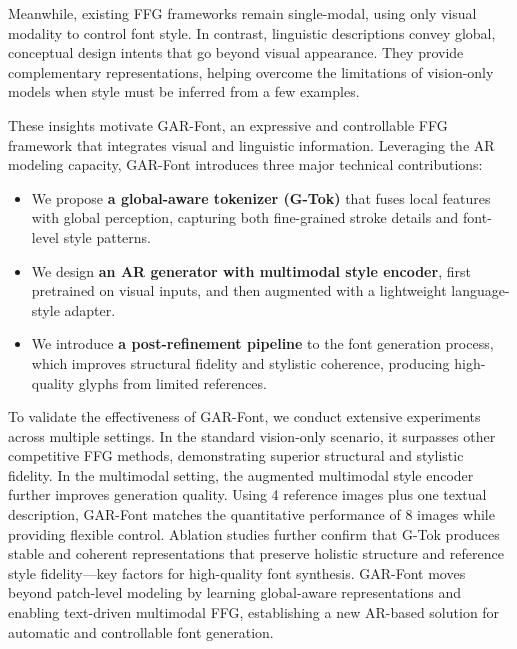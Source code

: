 Meanwhile, existing FFG frameworks remain single-modal, using only visual modality to control font style. In contrast, linguistic descriptions convey global, conceptual design intents that go beyond visual appearance. They provide complementary representations, helping overcome the limitations of vision-only models when style must be inferred from a few examples.


These insights motivate GAR-Font, an expressive and controllable FFG framework that integrates visual and linguistic information. Leveraging the AR modeling capacity, GAR-Font introduces three major technical contributions:

\begin{itemize}
\item We propose \textbf{a global-aware tokenizer (G-Tok)} that fuses local features with global perception, capturing both fine-grained stroke details and font-level style patterns.
\item We design \textbf{an AR generator with multimodal style encoder}, first pretrained on visual inputs, and then augmented with a lightweight language-style adapter.
\item We introduce \textbf{a post-refinement pipeline} to the font generation process, which improves structural fidelity and stylistic coherence, producing high-quality glyphs from limited references.
\end{itemize}

To validate the effectiveness of GAR-Font, we conduct extensive experiments across multiple settings. In the standard vision-only scenario, it surpasses other competitive FFG methods, demonstrating superior structural and stylistic fidelity. In the multimodal setting, the augmented multimodal style encoder further improves generation quality. Using 4 reference images plus one textual description, GAR-Font matches the quantitative performance of 8 images while providing flexible control. Ablation studies further confirm that G-Tok produces stable and coherent representations that preserve holistic structure and reference style fidelity—key factors for high-quality font synthesis. GAR-Font moves beyond patch-level modeling by learning global-aware representations and enabling text-driven multimodal FFG, establishing a new AR-based solution for automatic and controllable font generation.

